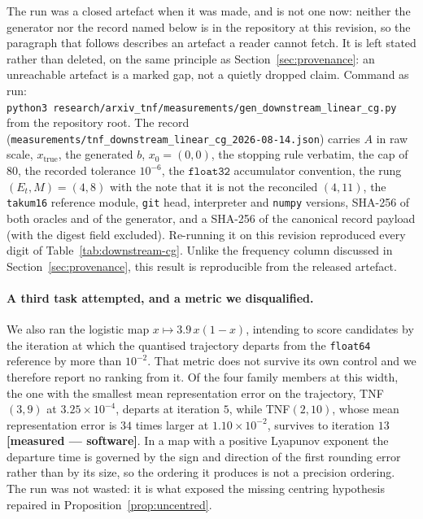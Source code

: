 \documentclass[11pt]{article}
\theoremstyle{definition}
\begin{document}
\begin{sloppypar}
The run was a closed artefact when it was made, and is not one now: neither the
generator nor the record named below is in the repository at this revision, so the
paragraph that follows describes an artefact a reader cannot fetch. It is left
stated rather than deleted, on the same principle as
Section~\ref{sec:provenance}: an unreachable artefact is a marked gap, not a
quietly dropped claim. Command as run:
\texttt{python3}\ \texttt{research/}\allowbreak\texttt{arxiv\_tnf/}\allowbreak\texttt{measurements/}\allowbreak\texttt{gen\_downstream\_}\allowbreak\texttt{linear\_cg.py}
from the repository root. The record
(\texttt{measurements/}\allowbreak\texttt{tnf\_downstream\_}\allowbreak\texttt{linear\_cg\_}\allowbreak\texttt{2026-08-14.json}) carries $A$ in
raw scale, $x_{\text{true}}$, the generated $b$, $x_0 = (0,0)$, the stopping rule
verbatim, the cap of $80$, the recorded tolerance $10^{-6}$, the $\texttt{float32}$
accumulator convention, the rung $(E_t,M)=(4,8)$ with the note that it is not the
reconciled $(4,11)$, the \texttt{takum16} reference module, \texttt{git} head,
interpreter and \texttt{numpy} versions, SHA-256 of both oracles and of the
generator, and a SHA-256 of the canonical record payload (with the digest field
excluded). Re-running it on this revision reproduced
every digit of Table~\ref{tab:downstream-cg}. Unlike the frequency column discussed
in Section~\ref{sec:provenance}, this result is reproducible from the released
artefact.
\end{sloppypar}

\paragraph{A third task attempted, and a metric we disqualified.} We also ran the
logistic map $x \mapsto 3.9\,x(1-x)$, intending to score candidates by the
iteration at which the quantised trajectory departs from the \texttt{float64}
reference by more than $10^{-2}$. That metric does not survive its own control and
we therefore report no ranking from it. Of the four family members at this width,
the one with the smallest mean representation error on the trajectory, TNF$(3,9)$
at $3.25\times10^{-4}$, departs at iteration $5$, while TNF$(2,10)$, whose mean
representation error is $34$ times larger at $1.10\times10^{-2}$, survives to
iteration $13$ \textbf{[measured --- software]}. In a map with a positive Lyapunov
exponent the departure time is governed by the sign and direction of the first
rounding error rather than by its size, so the ordering it produces is not a
precision ordering. The run was not wasted: it is what exposed the missing
centring hypothesis repaired in Proposition~\ref{prop:uncentred}.
\end{document}
